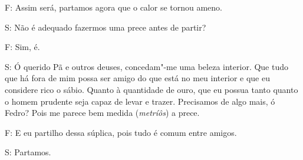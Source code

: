  

F: Assim será, partamos agora que o calor se tornou ameno.

 

S: Não é adequado fazermos uma prece antes de partir?

 

F: Sim, é.

 

S: Ó querido Pã e outros deuses, concedam"-me uma beleza interior. Que
tudo que há fora de mim possa ser amigo do que está no meu interior
\bekker{[279c]} e que eu considere rico o sábio. Quanto à
quantidade de ouro, que eu possua tanto quanto o homem prudente seja
capaz de levar e trazer. Precisamos de algo mais, ó Fedro? Pois me
parece bem medida (\emph{metríôs}) a prece.

F: E eu partilho dessa súplica, pois tudo é comum entre
amigos.

S: Partamos.


